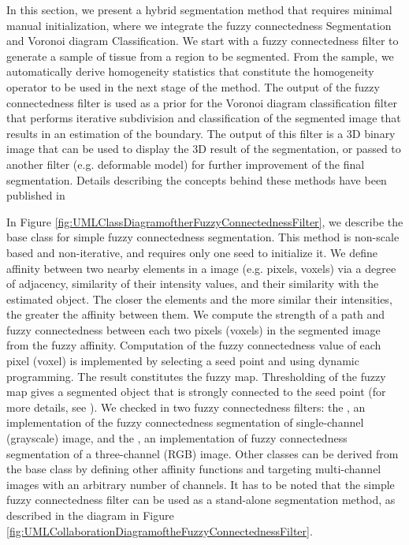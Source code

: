  In this section, we present a hybrid segmentation method that
requires minimal
 manual initialization, where we integrate the fuzzy
connectedness Segmentation
 and Voronoi diagram Classification. We
start with a fuzzy connectedness filter
 to generate a sample of
tissue from a region to be segmented. From the sample,
 we
automatically derive homogeneity statistics that constitute the
homogeneity
 operator to be used in the next stage of the method. The
output of the fuzzy 
 connectedness filter is used as a prior for the
Voronoi diagram classification 
 filter that performs iterative
subdivision and classification of the segmented
 image that results in
an estimation of the boundary. The output of this filter
 is a 3D
binary image that can be used to display the 3D result of the
segmentation, or passed to another filter (e.g. deformable model) for
further
 improvement of the final segmentation. Details describing the
concepts behind these methods 
 have been published in
\cite{Angelini2002,Udupa2002,Jin2002,Imielinska2001,Imielinska2000a,Imielinska2000b}

In Figure \ref{fig:UMLClassDiagramoftherFuzzyConnectednessFilter}, we describe 
the base class for simple fuzzy connectedness segmentation. This method is non-scale 
based and non-iterative, and requires only one seed to initialize it. We define affinity 
between two nearby elements in a image (e.g. pixels, voxels) via a degree of adjacency, 
similarity of their intensity values, and their similarity with the estimated object. 
The closer the elements and the more similar their intensities, the greater the affinity between them. We compute the strength of a path and fuzzy connectedness 
between each two pixels (voxels) in the segmented image from the fuzzy affinity. 
Computation of the fuzzy connectedness value of each pixel (voxel) is implemented
by selecting a seed point and using dynamic programming. The result constitutes the fuzzy
map. Thresholding of the fuzzy map gives a segmented object that is strongly connected
to the seed point (for more details, see \cite{Udupa1996}). We checked in two fuzzy 
connectedness filters: the , an
implementation of the fuzzy connectedness segmentation of single-channel (grayscale) 
image, and the , an implementation of fuzzy
connectedness segmentation of a three-channel (RGB) image. Other classes can be derived 
from the base class by defining other affinity functions and targeting multi-channel
images with an arbitrary number of channels. It has to be noted that the simple fuzzy 
connectedness filter can be used as a stand-alone segmentation method,
as described in the diagram in Figure 
\ref{fig:UMLCollaborationDiagramoftheFuzzyConnectednessFilter}.

